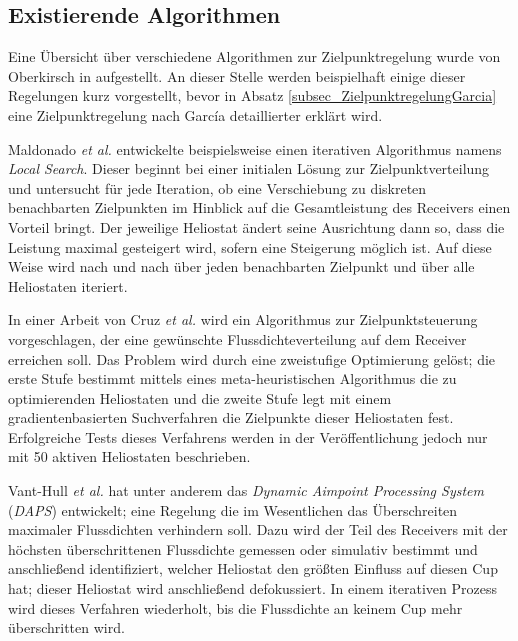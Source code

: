 \subsection{Existierende Algorithmen} \label{subsec_ZielpunktregelungLiteratur}
Eine Übersicht über verschiedene Algorithmen zur Zielpunktregelung wurde von Oberkirsch in \cite{DissOberkirsch} aufgestellt.
An dieser Stelle werden beispielhaft einige dieser Regelungen kurz vorgestellt, bevor in Absatz \ref{subsec_ZielpunktregelungGarcia} eine Zielpunktregelung nach García detaillierter erklärt wird.

Maldonado \textit{et al.} \cite{Maldonado}\cite{Maldonado2} entwickelte beispielsweise einen iterativen Algorithmus namens \textit{Local Search}.
Dieser beginnt bei einer initialen Lösung zur Zielpunktverteilung und untersucht für jede Iteration, ob eine Verschiebung zu diskreten benachbarten Zielpunkten im Hinblick auf die Gesamtleistung des Receivers einen Vorteil bringt.
Der jeweilige Heliostat ändert seine Ausrichtung dann so, dass die Leistung maximal gesteigert wird, sofern eine Steigerung möglich ist.
Auf diese Weise wird nach und nach über jeden benachbarten Zielpunkt und über alle Heliostaten iteriert.

In einer Arbeit von Cruz \textit{et al.} \cite{Cruz} wird ein Algorithmus zur Zielpunktsteuerung vorgeschlagen, der eine gewünschte Flussdichteverteilung auf dem Receiver erreichen soll.
Das Problem wird durch eine zweistufige Optimierung gelöst; die erste Stufe bestimmt mittels eines meta-heuristischen Algorithmus die zu optimierenden Heliostaten und die zweite Stufe legt mit einem gradientenbasierten Suchverfahren die Zielpunkte dieser Heliostaten fest. Erfolgreiche Tests dieses Verfahrens werden in der Veröffentlichung jedoch nur mit 50 aktiven Heliostaten beschrieben.

Vant-Hull \textit{et al.} \cite{VantHull2}\cite{VantHull3} hat unter anderem das \textit{Dynamic Aimpoint Processing System} (\textit{DAPS}) entwickelt; eine Regelung die im Wesentlichen das Überschreiten maximaler Flussdichten verhindern soll.
Dazu wird der Teil des Receivers mit der höchsten überschrittenen Flussdichte gemessen oder simulativ bestimmt und anschließend identifiziert, welcher Heliostat den größten Einfluss auf diesen Cup hat; dieser Heliostat wird anschließend defokussiert.
In einem iterativen Prozess wird dieses Verfahren wiederholt, bis die Flussdichte an keinem Cup mehr überschritten wird.

